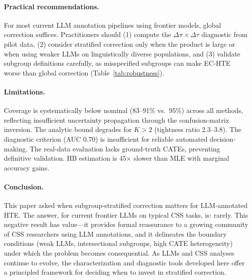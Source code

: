 \documentclass[11pt,a4paper]{article}
\begin{document}
\paragraph{Practical recommendations.} For most current LLM annotation pipelines using frontier models, global correction suffices. Practitioners should (1) compute the $\Delta\pi \times \Delta\tau$ diagnostic from pilot data, (2) consider stratified correction only when the product is large or when using weaker LLMs on linguistically diverse populations, and (3) validate subgroup definitions carefully, as misspecified subgroups can make EC-HTE worse than global correction (Table~\ref{tab:robustness}).

\paragraph{Limitations.} Coverage is systematically below nominal (83--91\% vs.\ 95\%) across all methods, reflecting insufficient uncertainty propagation through the confusion-matrix inversion. The analytic bound degrades for $K > 2$ (tightness ratio 2.3--3.8). The diagnostic criterion (AUC 0.70) is insufficient for reliable automated decision-making. The real-data evaluation lacks ground-truth CATEs, preventing definitive validation. HB estimation is 45$\times$ slower than MLE with marginal accuracy gains.

\paragraph{Conclusion.} This paper asked when subgroup-stratified correction matters for LLM-annotated HTE. The answer, for current frontier LLMs on typical CSS tasks, is: rarely. This negative result has value---it provides formal reassurance to a growing community of CSS researchers using LLM annotations, and it delineates the boundary conditions (weak LLMs, intersectional subgroups, high CATE heterogeneity) under which the problem becomes consequential. As LLMs and CSS analyses continue to evolve, the characterization and diagnostic tools developed here offer a principled framework for deciding when to invest in stratified correction.



\end{document}
